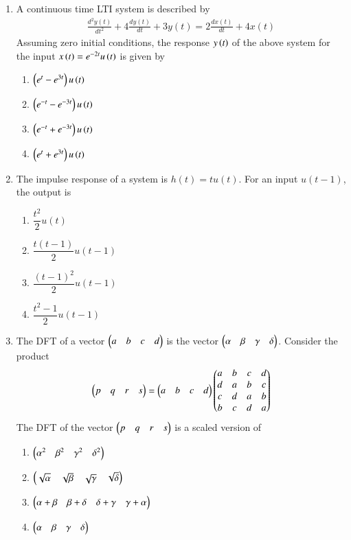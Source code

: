 \renewcommand{\theequation}{\theenumi}
\begin{enumerate}[label=\arabic*.,ref=\theenumi]

\item A continuous time LTI system is described by
\begin{align}
    \frac{d^2y(t)}{dt^2}+4\frac{dy(t)}{dt}+3y(t) = 2\frac{dx(t)}{dt}+4x(t)\label{ec/2010/41/q}
\end{align}
Assuming zero initial conditions, the response $y\left(t\right)$ of the above system for the input $x\left(t\right)=e^{-2t}u\left(t\right)$ is given by
\begin{enumerate}
    \item $\left(e^t-e^{3t}\right)u\left(t\right)$
    \item $\left(e^{-t}-e^{-3t}\right)u\left(t\right)$
    \item $\left(e^{-t}+e^{-3t}\right)u\left(t\right)$
    \item $\left(e^{t}+e^{3t}\right)u\left(t\right)$
\end{enumerate}
\solution


\item The impulse response of a system is $h(t)=tu(t)$. For an input $u(t-1)$, the output is 
\begin{enumerate}
    \item $\dfrac{t^{2}}{2}u(t)$
    \item $\dfrac{t(t-1)}{2}u(t-1)$
    \item $\dfrac{(t-1)^{2}}{2}u(t-1)$
    \item $\dfrac{t^{2}-1}{2}u(t-1)$
\end{enumerate}
\solution

%
\item The DFT of a vector $\begin{pmatrix}a & b & c & d\end{pmatrix}$ is the vector $\begin{pmatrix}\alpha & \beta & \gamma & \delta\end{pmatrix}$. Consider the product 
\begin{equation}
    \begin{pmatrix}p & q & r & s\end{pmatrix} = \begin{pmatrix}a & b & c & d\end{pmatrix}\begin{pmatrix}a & b & c & d\\ d & a & b & c\\ c & d & a & b\\b & c & d &a\end{pmatrix}
\end{equation}
The DFT of the vector $\begin{pmatrix}p & q & r & s\end{pmatrix}$ is a scaled version of 
\begin{enumerate}[label = (\Alph*)]
    \item $\begin{pmatrix}\alpha^2 & \beta ^2 & \gamma^2 & \delta^2\end{pmatrix}$
    \item $\begin{pmatrix}\sqrt{\alpha} & \sqrt{\beta} & \sqrt{\gamma} & \sqrt{\delta}\end{pmatrix}$
    \item $\begin{pmatrix}\alpha+\beta & \beta+\delta & \delta+\gamma & \gamma+\alpha\end{pmatrix}$
    \item $\begin{pmatrix}\alpha & \beta & \gamma & \delta\end{pmatrix}$
\end{enumerate}
\solution



\end{enumerate}
